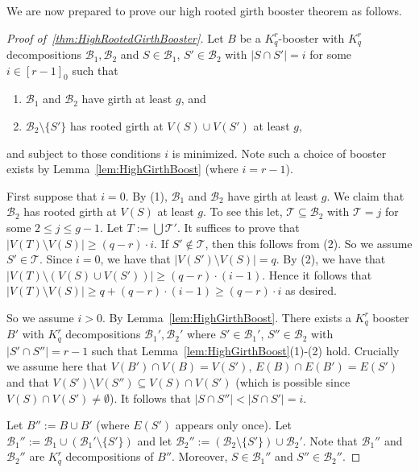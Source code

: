 \documentclass[11pt]{article}
\newcounter{i}
\theoremstyle{plain}
\renewcommand{\theclaim}{\thetheorem.\arabic{claim}}
\newenvironment{lateproof}[1]
 {%
  \renewcommand{\theclaim}{\ref{#1}.\arabic{claim}}%
  \begin{proof}[Proof of~\cref{#1}]%
 }
 {\end{proof}}
\theoremstyle{plain} %
\theoremstyle{definition}
\begin{document}
We are now prepared to prove our high rooted girth booster theorem as follows.

\begin{lateproof}{thm:HighRootedGirthBooster}
Let $B$ be a $K_q^r$-booster with $K_q^r$ decompositions $\mathcal{B}_1,\mathcal{B}_2$ and $S\in \mathcal{B}_1$, $S'\in \mathcal{B}_2$ with $|S\cap S'|=i$ for some $i\in [r-1]_0$ such that 
\begin{enumerate}
    \item[(1)] $\mathcal{B}_1$ and $\mathcal{B}_2$ have girth at least $g$, and
    \item[(2)] $\mathcal{B}_2\setminus \{S'\}$ has rooted girth at $V(S)\cup V(S')$ at least $g$,
\end{enumerate}
and subject to those conditions $i$ is minimized. Note such a choice of booster exists by Lemma~\ref{lem:HighGirthBoost} (where $i=r-1$).

First suppose that $i=0$. By (1), $\mathcal{B}_1$ and $\mathcal{B}_2$ have girth at least $g$. We claim that $\mathcal{B}_2$ has rooted girth at $V(S)$ at least $g$. To see this let, $\mathcal{T}\subseteq \mathcal{B}_2$ with $\mathcal{T}=j$ for some $2\le j \le g-1$. Let $T:= \bigcup \mathcal{T}'$. It suffices to prove that $|V(T)\setminus V(S)|\ge (q-r)\cdot i$. If $S'\not\in \mathcal{T}$, then this follows from (2). So we assume $S'\in \mathcal{T}$. Since $i=0$, we have that $|V(S')\setminus V(S)|=q$. By (2), we have that $|V(T)\setminus (V(S)\cup V(S'))|\ge (q-r)\cdot (i-1)$. Hence it follows that $|V(T)\setminus V(S)|\ge q + (q-r)\cdot (i-1) \ge (q-r)\cdot i$ as desired.

So we assume $i > 0$. By Lemma~\ref{lem:HighGirthBoost}. There exists a $K_q^r$ booster $B'$ with $K_q^r$ decompositions $\mathcal{B}_1', \mathcal{B}_2'$ where $S'\in \mathcal{B}_1'$, $S''\in \mathcal{B}_2$ with $|S'\cap S''|=r-1$ such that Lemma~\ref{lem:HighGirthBoost}(1)-(2) hold. Crucially we assume here that $V(B')\cap V(B) = V(S')$, $E(B)\cap E(B') = E(S')$ and that $V(S')\setminus V(S'') \subseteq V(S)\cap V(S')$ (which is possible since $V(S)\cap V(S')\ne \emptyset$). It follows that $|S\cap S''| < |S\cap S'| = i$. 

Let $B'' := B\cup B'$ (where $E(S')$ appears only once). Let $\mathcal{B}_1'' := \mathcal{B}_1\cup (\mathcal{B}_1'\setminus \{S'\})$ and let $\mathcal{B}_2'' := (\mathcal{B}_2\setminus \{S'\})\cup\mathcal{B}_2'$. Note that $\mathcal{B}_1''$ and $\mathcal{B}_2''$ are $K_q^r$ decompositions of $B''$. Moreover, $S\in \mathcal{B}_1''$ and $S''\in \mathcal{B}_2''$.


\end{lateproof}
\end{document}
